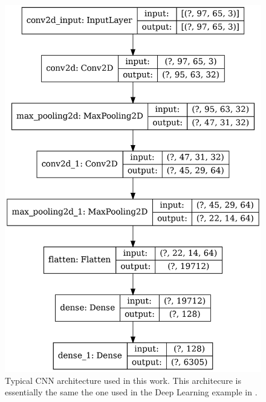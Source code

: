 \documentclass[12pt]{article}
\begin{document}
%
\begin{figure}[h] 
   \centering
    \includegraphics[totalheight=9cm]{Figures/typical_cnn.png}
    \caption{\label{fig:typical_cnn}Typical CNN architecture used in this work. This architecure is essentially the same the one used in the Deep Learning example in \cite{misc:udemy}.}
\end{figure}
%
%
\end{document}
